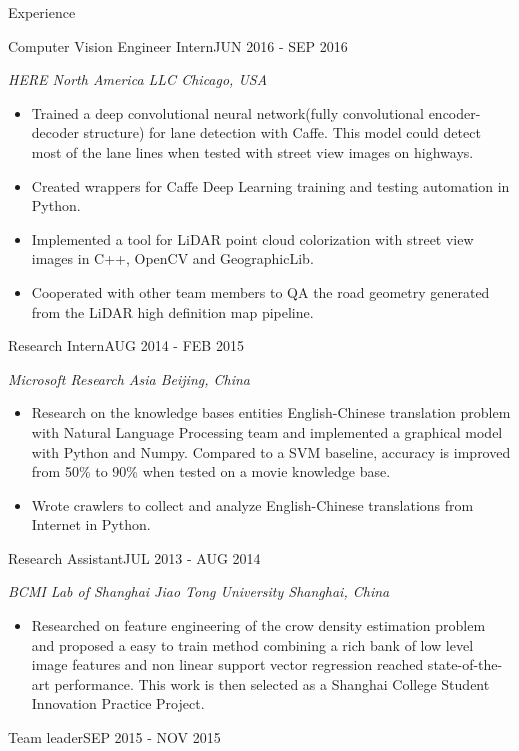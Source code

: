 \documentclass{resume} %
\begin{document}
\begin{rSection}{Experience}
\begin{rSubsection}{Computer Vision Engineer Intern}{JUN 2016 - SEP 2016}{}
	
	{\em HERE North America LLC \hfill Chicago, USA}
	
	\begin{itemize}
	\item Trained a deep convolutional neural network(fully convolutional encoder-decoder structure) for lane detection with Caffe. This model could detect most of the lane lines when tested with street view images on highways.
	\item Created wrappers for Caffe Deep Learning training and testing automation in Python.
	\item Implemented a tool for LiDAR point cloud colorization with street view images in C++, OpenCV and GeographicLib.
	\item Cooperated with other team members to QA the road geometry generated from the LiDAR high definition map pipeline.
	\end{itemize}
\end{rSubsection}	

\begin{rSubsection}{Research Intern}{AUG 2014 - FEB 2015}{}

{\em Microsoft Research Asia \hfill Beijing, China}

\begin{itemize}
\item Research on the knowledge bases entities English-Chinese translation problem with Natural Language Processing team and implemented a graphical model with Python and Numpy. Compared to a SVM baseline, accuracy is improved from 50\% to 90\% when tested on a movie knowledge base.
\item Wrote crawlers to collect and analyze English-Chinese translations from Internet in Python.
\end{itemize}
\end{rSubsection}
\vspace{5pt}
\begin{rSubsection}{Research Assistant}{JUL 2013 - AUG 2014}{}
	
{\em BCMI Lab of Shanghai Jiao Tong University \hfill Shanghai, China}

\begin{itemize}
\item Researched on feature engineering of the crow density estimation problem and proposed a easy to train method combining a rich bank of low level image features and non linear support vector regression reached state-of-the-art performance. This work is then selected as a Shanghai College Student Innovation Practice Project.
\end{itemize}
\end{rSubsection}
\begin{rSubsection}{Team leader}{SEP 2015 - NOV 2015}{}
	

\end{rSubsection}
\end{rSection}
\end{document}
